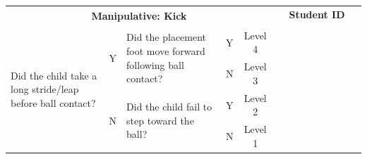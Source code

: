 \documentclass[
  letterpaper,
  DIV=11,
  numbers=noendperiod]{scrartcl}
\begin{document}
\begin{tabular}{|p{5.5cm}|c|p{5.5cm}|c|c|*{9}{p{1.07cm}|}}
\hline
\multicolumn{5}{|c|}{\multirow{2}{*}{\centering \textbf{Manipulative: Kick}}} & \multicolumn{9}{c|}{\textbf{Student ID}} \\ 
\cline{6-14}
\multicolumn{5}{|c|}{} & & & & & & & & & \\
\hline
\multirow{4}{5.5cm}{\raggedright {\footnotesize Did the child take a long stride/leap before ball contact?}} 
& \multirow{2}{*}{\footnotesize Y} 
& \multirow{2}{5.5cm}{\raggedright {\footnotesize Did the placement foot move forward following ball contact?}} & {\footnotesize Y} & {\footnotesize Level 4} & & & & & & & & & \\
\cline{4-14}
& & & {\footnotesize N} & {\footnotesize Level 3} & & & & & & & & & \\
\cline{2-14}
& \multirow{2}{*}{\footnotesize N} & \multirow{2}{5.5cm}{\raggedright {\footnotesize Did the child fail to step toward the ball?}} & {\footnotesize Y} & {\footnotesize Level 2} & & & & & & & & & \\
\cline{4-14}
& & & {\footnotesize N} & {\footnotesize Level 1} & & & & & & & & & \\
\hline
\end{tabular}

\vspace{.5em}
\end{document}
